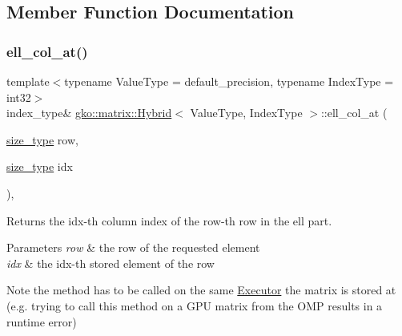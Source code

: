 \subsection{Member Function Documentation}
\mbox{\label{classgko_1_1matrix_1_1Hybrid_ad41c68dbda50589378ad481c0ab8feea}} 
\subsubsection{\texorpdfstring{ell\+\_\+col\+\_\+at()}{ell\_col\_at()}\hspace{0.1cm}{\footnotesize\ttfamily [1/2]}}
{\footnotesize\ttfamily template$<$typename Value\+Type = default\+\_\+precision, typename Index\+Type = int32$>$ \\
index\+\_\+type\& \hyperlink{classgko_1_1matrix_1_1Hybrid}{gko\+::matrix\+::\+Hybrid}$<$ Value\+Type, Index\+Type $>$\+::ell\+\_\+col\+\_\+at (\begin{DoxyParamCaption}\item[{\hyperlink{namespacegko_a6e5c95df0ae4e47aab2f604a22d98ee7}{size\+\_\+type}}]{row,  }\item[{\hyperlink{namespacegko_a6e5c95df0ae4e47aab2f604a22d98ee7}{size\+\_\+type}}]{idx }\end{DoxyParamCaption})\hspace{0.3cm}{\ttfamily [inline]}, {\ttfamily [noexcept]}}



Returns the {\ttfamily idx}-\/th column index of the {\ttfamily row}-\/th row in the ell part. 


\begin{DoxyParams}{Parameters}
{\em row} & the row of the requested element \\
\hline
{\em idx} & the idx-\/th stored element of the row\\
\hline
\end{DoxyParams}
\begin{DoxyNote}{Note}
the method has to be called on the same \hyperlink{classgko_1_1Executor}{Executor} the matrix is stored at (e.\+g. trying to call this method on a G\+PU matrix from the O\+MP results in a runtime error) 
\end{DoxyNote}
\mbox{\label{classgko_1_1matrix_1_1Hybrid_a3a2d9b00dd8b2333b05a97d968dfabff}} 
